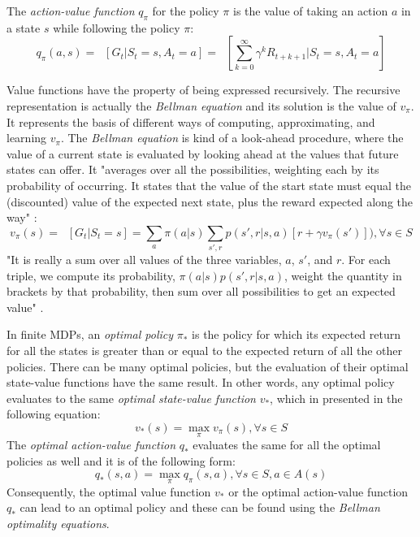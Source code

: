 The \textit{action-value function} $q_{\pi }$ for the policy $\pi$ is the value of taking an action $a$ in a state $s$ while following the policy $\pi$:
\begin{equation}
q_{\pi }(a,s)=\mathop{{}\mathbb{E}_{\pi}}\left [G_{t}|S_{t}=s,A_{t}=a \right ]=\mathop{{}\mathbb{E}_{\pi}}\left [ \sum_{k=0}^{\infty}\gamma ^kR_{t+k+1} |S_{t}=s,A_{t}=a\right ]
\end{equation}

Value functions have the property of being expressed recursively. The recursive representation is actually the \textit{Bellman equation} and its solution is the value of $v_{\pi }$. It represents the basis of different ways of computing, approximating, and learning $v_{\pi }$. The \textit{Bellman equation} is kind of a look-ahead procedure, where the value of a current state is evaluated by looking ahead at the values that future states can offer. It "averages over all the possibilities, weighting each by its probability of occurring. It states that the value of the start state must equal the (discounted) value of the expected next state, plus the reward expected along the way" \cite{Sutton}:
\begin{equation}\label{StateValueFunction}
v_{\pi }(s)=\mathop{{}\mathbb{E}_{\pi}}\left [G_{t}|S_{t}=s \right ]=\sum_{a}\pi(a|s)\sum_{s',r}p(s',r|s,a)\left [ r+\gamma v_{\pi }(s') \right ]), \forall s\in S
\end{equation}
"It is really a sum over all values of the three variables, $a$, $s'$, and $r$. For each triple, we compute its probability, $\pi(a|s)p(s',r|s,a)$, weight the quantity in brackets by that probability, then sum over all possibilities to get an expected  value" \cite{Sutton}.

In finite MDPs, an \textit{optimal policy} $\pi_{*}$ is the policy for which its expected return for all the states is greater than or equal to the expected return of all the other policies. There can be many optimal policies, but the evaluation of their optimal state-value functions have the same result. In other words, any optimal policy evaluates to the same \textit{optimal state-value function} $v_{*}$, which in presented in the following equation:
\begin{equation}
v_{*}(s)=\max_{\pi}v_{\pi}(s), \forall s\in S
\end{equation}
The \textit{optimal action-value function} $q_{*}$ evaluates the same for all the optimal policies as well and it is of the following form:
\begin{equation}
q_{*}(s,a)=\max_{\pi}q_{\pi}(s,a), \forall s\in S , a \in A(s)
\end{equation}
Consequently, the optimal value function $v_{*}$ or the optimal action-value function $q_{*}$ can lead to an optimal policy and these can be found using the \textit{Bellman optimality equations}.

